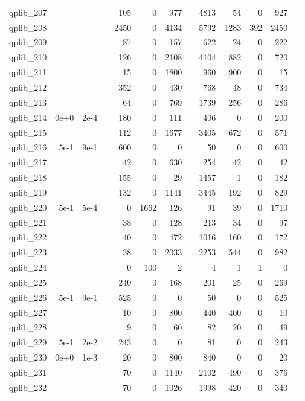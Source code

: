 \begin{table}
\begin{tabular}{lrrrrrrrrrrrr}
qplib\_207	&		&		&	&	105	&	0	&	977	&	&	4813	&	54	&	0	&	927	\\
qplib\_208	&		&		&	&	2450	&	0	&	4134	&	&	5792	&	1283	&	392	&	2450	\\
qplib\_209	&		&		&	&	87	&	0	&	157	&	&	622	&	24	&	0	&	222	\\
qplib\_210	&		&		&	&	126	&	0	&	2108	&	&	4104	&	882	&	0	&	720	\\
qplib\_211	&		&		&	&	15	&	0	&	1800	&	&	960	&	900	&	0	&	15	\\
qplib\_212	&		&		&	&	352	&	0	&	430	&	&	768	&	48	&	0	&	734	\\
qplib\_213	&		&		&	&	64	&	0	&	769	&	&	1739	&	256	&	0	&	286	\\
qplib\_214	&	0e+0	&	2e-4	&	&	180	&	0	&	111	&	&	406	&	0	&	0	&	200	\\
qplib\_215	&		&		&	&	112	&	0	&	1677	&	&	3405	&	672	&	0	&	571	\\
qplib\_216	&	5e-1	&	9e-1	&	&	600	&	0	&	0	&	&	50	&	0	&	0	&	600	\\
qplib\_217	&		&		&	&	42	&	0	&	630	&	&	254	&	42	&	0	&	42	\\
qplib\_218	&		&		&	&	155	&	0	&	29	&	&	1457	&	1	&	0	&	182	\\
qplib\_219	&		&		&	&	132	&	0	&	1141	&	&	3445	&	192	&	0	&	829	\\
qplib\_220	&	5e-1	&	5e-4	&	&	0	&	1662	&	126	&	&	91	&	39	&	0	&	1710	\\
qplib\_221	&		&		&	&	38	&	0	&	128	&	&	213	&	34	&	0	&	97	\\
qplib\_222	&		&		&	&	40	&	0	&	472	&	&	1016	&	160	&	0	&	172	\\
qplib\_223	&		&		&	&	38	&	0	&	2033	&	&	2253	&	544	&	0	&	982	\\
qplib\_224	&		&		&	&	0	&	100	&	2	&	&	4	&	1	&	1	&	0	\\
qplib\_225	&		&		&	&	240	&	0	&	168	&	&	201	&	25	&	0	&	269	\\
qplib\_226	&	5e-1	&	9e-1	&	&	525	&	0	&	0	&	&	50	&	0	&	0	&	525	\\
qplib\_227	&		&		&	&	10	&	0	&	800	&	&	440	&	400	&	0	&	10	\\
qplib\_228	&		&		&	&	9	&	0	&	60	&	&	82	&	20	&	0	&	49	\\
qplib\_229	&	5e-1	&	2e-2	&	&	243	&	0	&	0	&	&	81	&	0	&	0	&	243	\\
qplib\_230	&	0e+0	&	1e-3	&	&	20	&	0	&	800	&	&	840	&	0	&	0	&	20	\\
qplib\_231	&		&		&	&	70	&	0	&	1140	&	&	2102	&	490	&	0	&	376	\\
qplib\_232	&		&		&	&	70	&	0	&	1026	&	&	1998	&	420	&	0	&	340	\\

\end{tabular}
\end{table}
